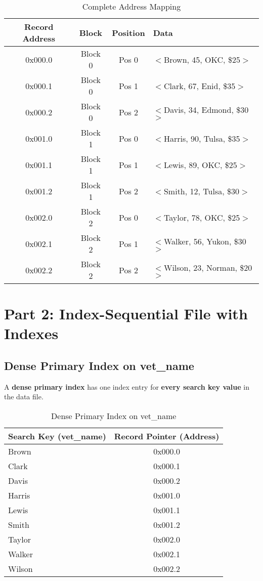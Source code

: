 \documentclass[12pt]{article}
\begin{document}
\begin{table}[h]
\centering
\begin{tabular}{|c|c|c|l|}
\hline
\textbf{Record Address} & \textbf{Block} & \textbf{Position} & \textbf{Data} \\
\hline
0x000.0 & Block 0 & Pos 0 & $<$Brown, 45, OKC, \$25$>$ \\
0x000.1 & Block 0 & Pos 1 & $<$Clark, 67, Enid, \$35$>$ \\
0x000.2 & Block 0 & Pos 2 & $<$Davis, 34, Edmond, \$30$>$ \\
\hline
0x001.0 & Block 1 & Pos 0 & $<$Harris, 90, Tulsa, \$35$>$ \\
0x001.1 & Block 1 & Pos 1 & $<$Lewis, 89, OKC, \$25$>$ \\
0x001.2 & Block 1 & Pos 2 & $<$Smith, 12, Tulsa, \$30$>$ \\
\hline
0x002.0 & Block 2 & Pos 0 & $<$Taylor, 78, OKC, \$25$>$ \\
0x002.1 & Block 2 & Pos 1 & $<$Walker, 56, Yukon, \$30$>$ \\
0x002.2 & Block 2 & Pos 2 & $<$Wilson, 23, Norman, \$20$>$ \\
\hline
\end{tabular}
\caption{Complete Address Mapping}
\end{table}

\newpage
\section{Part 2: Index-Sequential File with Indexes}

\subsection{Dense Primary Index on vet\_name}

A \textbf{dense primary index} has one index entry for \textbf{every search key value} in the data file.

\begin{table}[h]
\centering
\begin{tabular}{|l|c|}
\hline
\textbf{Search Key (vet\_name)} & \textbf{Record Pointer (Address)} \\
\hline
Brown & 0x000.0 \\
Clark & 0x000.1 \\
Davis & 0x000.2 \\
Harris & 0x001.0 \\
Lewis & 0x001.1 \\
Smith & 0x001.2 \\
Taylor & 0x002.0 \\
Walker & 0x002.1 \\
Wilson & 0x002.2 \\
\hline
\end{tabular}
\caption{Dense Primary Index on vet\_name}
\end{table}
\end{document}
